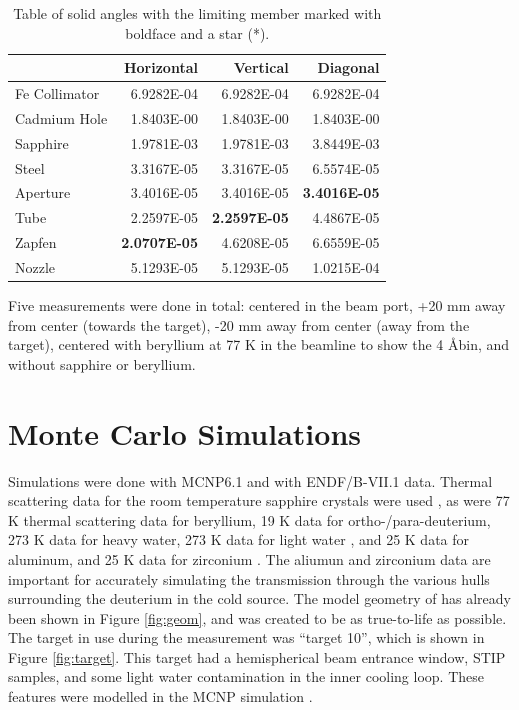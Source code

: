 \documentclass[preprint,12pt]{elsarticle}
\begin{document}
\begin{table}
\begin{center}
     \caption{Table of solid angles with the limiting member marked with boldface and a star (*).  \label{tab:sa} }
\begin{tabular}{|l|r|r|r|}
     \hline
                   &     Horizontal  &     Vertical   &     Diagonal   \\
     \hline
     Fe Collimator &     6.9282E-04  &     6.9282E-04 &     6.9282E-04 \\
     \hline 
     Cadmium Hole  &     1.8403E-00  &     1.8403E-00 &     1.8403E-00 \\
     \hline 
     Sapphire      &     1.9781E-03  &     1.9781E-03 &     3.8449E-03 \\
     \hline 
     Steel         &     3.3167E-05  &     3.3167E-05 &     6.5574E-05 \\
     \hline
     Aperture      &     3.4016E-05  &     3.4016E-05 &\bf* 3.4016E-05 \\
     \hline
     Tube          &     2.2597E-05  &\bf* 2.2597E-05 &    4.4867E-05  \\
     \hline
     Zapfen        &\bf* 2.0707E-05  &     4.6208E-05 &     6.6559E-05 \\
     \hline
     Nozzle        &     5.1293E-05  &     5.1293E-05 &     1.0215E-04 \\
     \hline
\end{tabular}
\end{center}
\end{table}

Five measurements were done in total: centered in the beam port, +20 mm away from center (towards the target), -20 mm away from center (away from the target), centered with beryllium at 77 K in the beamline to show the 4 \AA bin, and without sapphire or beryllium.

%
%
%
%
%

\section{Monte Carlo Simulations}
\label{sec:sim}

Simulations were done with MCNP6.1 and with ENDF/B-VII.1 data.  Thermal scattering data for the room temperature sapphire crystals were used \cite{sapp}, as were 77 K thermal scattering data for beryllium, 19 K data for ortho-/para-deuterium, 273 K data for heavy water, 273 K data for light water \cite{mcnp6}, and 25 K data for aluminum, and 25 K data for zirconium \cite{IKE}.  The aliumun and zirconium data are important for accurately simulating the transmission through the various hulls surrounding the deuterium in the cold source.  The model geometry of has already been shown in Figure \ref{fig:geom}, and was created to be as true-to-life as possible.  The target in use during the measurement was ``target 10'', which is shown in Figure \ref{fig:target}. This target had a hemispherical beam entrance window, STIP samples, and some light water contamination in the inner cooling loop.  These features were modelled in the MCNP simulation \cite{target10}.
\end{document}
